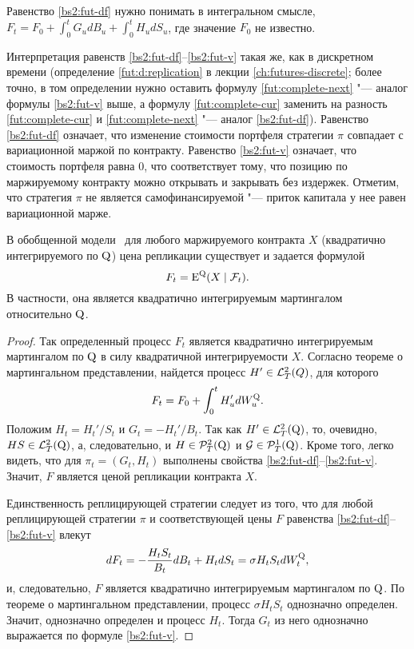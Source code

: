 \begin{remark}
Равенство \eqref{bs2:fut-df} нужно понимать в интегральном смысле, \te\ $F_t = F_0 + \int_0^t G_u dB_u + \int_0^t H_u d S_u$, где значение $F_0$ не известно.
\end{remark}

Интерпретация равенств \eqref{bs2:fut-df}--\eqref{bs2:fut-v} такая же, как в дискретном времени (определение \ref{fut:d:replication} в лекции \ref{ch:futures-discrete}; более точно, в том определении нужно оставить формулу \eqref{fut:complete-next} "--- аналог формулы \eqref{bs2:fut-v} выше, а формулу \eqref{fut:complete-cur} заменить на разность \eqref{fut:complete-cur} и \eqref{fut:complete-next} "--- аналог \eqref{bs2:fut-df}).
Равенство \eqref{bs2:fut-df} означает, что изменение стоимости портфеля стратегии $\pi$ совпадает с вариационной маржой по контракту.
Равенство \eqref{bs2:fut-v} означает, что стоимость портфеля равна 0, что соответствует тому, что позицию по маржируемому контракту можно открывать и закрывать без издержек.
Отметим, что стратегия $\pi$ не является самофинансируемой "--- приток капитала у нее равен вариационной марже.

\begin{proposition}
В обобщенной модели \bs\ для любого маржируемого контракта $X$ (квадратично интегрируемого по $\mathrm{Q}$) цена репликации существует и задается формулой
\[
F_t = \operatorname{E}^{\mathrm{Q}} (X\mid \mathcal{F}_t).
\]
В частности, она является квадратично интегрируемым мартингалом относительно $\mathrm{Q}$. 
\end{proposition}

\begin{proof}
Так определенный процесс $F_t$ является квадратично интегрируемым мартингалом по $\mathrm{Q}$ в силу квадратичной интегрируемости $X$.
Согласно теореме о мартингальном представлении, найдется процесс $H'\in \mathcal{L}_T^2(Q)$, для которого 
\[
F_t = F_0 + \int_0^t H_u' d W_u^{\mathrm{Q}}.
\]
Положим $H_t = H_t'/S_t$ и $G_t = -H_t'/B_t$.
Так как $H'\in \mathcal{L}_T^2(\mathrm{Q})$, то, очевидно, $HS\in\mathcal{L}^2_T(\mathrm{Q})$, а, следовательно, и $H\in\mathcal{P}_T^2(\mathrm{Q})$ и $\mathcal{G}\in\mathcal{P}^1_T(\mathrm{Q})$.
Кроме того, легко видеть, что для $\pi_t=(G_t,H_t)$ выполнены свойства \eqref{bs2:fut-df}--\eqref{bs2:fut-v}.
Значит, $F$ является ценой репликации контракта $X$.

Единственность реплицирующей стратегии следует из того, что для любой реплицирующей стратегии $\pi$ и соответствующей цены $F$ равенства \eqref{bs2:fut-df}--\eqref{bs2:fut-v} влекут
\[
d F_t = -\frac{H_tS_t}{B_t}dB_t + H_tdS_t = \sigma H_t S_t dW_t^{\mathrm{Q}},
\]
и, следовательно, $F$ является квадратично интегрируемым мартингалом по $\mathrm{Q}$. По теореме о мартингальном представлении, процесс $\sigma H_t S_t$ однозначно определен.
Значит, однозначно определен и процесс $H_t$. Тогда $G_t$ из него однозначно выражается по формуле \eqref{bs2:fut-v}.
\end{proof}

